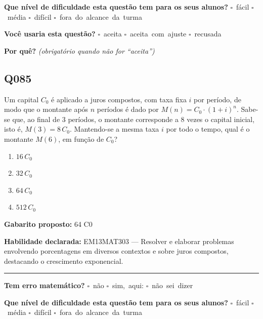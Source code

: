 \documentclass[11pt,a4paper]{article}
\begin{document}
\textbf{Que nível de dificuldade esta questão tem para os seus alunos?}\quad
\mbox{$\square$~fácil} \quad \mbox{$\square$~média} \quad
\mbox{$\square$~difícil} \quad \mbox{$\square$~fora do alcance da turma}

\textbf{Você usaria esta questão?}\quad
\mbox{$\square$~aceita} \quad \mbox{$\square$~aceita com ajuste} \quad
\mbox{$\square$~recusada}

\textbf{Por quê?} \emph{(obrigatório quando não for ``aceita'')}

\underline{\hspace{\linewidth}}

\underline{\hspace{\linewidth}}
\vspace{0.6em}

\begin{samepage}
\subsection*{Q085}
Um capital $C_0$ é aplicado a juros compostos, com taxa fixa $i$ por período, de modo que o montante após $n$ períodos é dado por $M(n) = C_0\cdot(1+i)^n$. Sabe-se que, ao final de 3 períodos, o montante corresponde a 8 vezes o capital inicial, isto é, $M(3) = 8\,C_0$. Mantendo-se a mesma taxa $i$ por todo o tempo, qual é o montante $M(6)$, em função de $C_0$?
\begin{enumerate}[label=(\alph*),nosep,leftmargin=*]
\item $16\,C_0$
\item $32\,C_0$
\item $64\,C_0$
\item $512\,C_0$
\end{enumerate}

\textbf{Gabarito proposto:} 64 C0

\textbf{Habilidade declarada:} EM13MAT303 --- Resolver e elaborar problemas envolvendo porcentagens em diversos contextos e sobre juros compostos, destacando o crescimento exponencial.
\end{samepage}

\noindent\rule{\linewidth}{0.4pt}
\textbf{Tem erro matemático?}\quad
\mbox{$\square$~não} \quad \mbox{$\square$~sim, aqui:} \underline{\hspace{5cm}}
\quad \mbox{$\square$~não sei dizer}

\textbf{Que nível de dificuldade esta questão tem para os seus alunos?}\quad
\mbox{$\square$~fácil} \quad \mbox{$\square$~média} \quad
\mbox{$\square$~difícil} \quad \mbox{$\square$~fora do alcance da turma}
\end{document}
